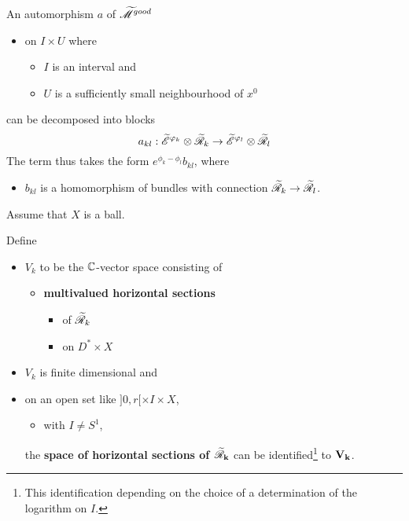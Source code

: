 An automorphism $a$ of $\widetilde{\mathscr{M}}^{good}$
\begin{itemize}
  \item on $I\times U$ where
    \begin{itemize}
      \item $I$ is an interval and
      \item $U$ is a sufficiently small neighbourhood of $x^0$
    \end{itemize}
\end{itemize}
can be decomposed into blocks
\[
  a_{kl}:\widetilde{\mathscr{E}}^{\varphi_k}\otimes\widetilde{\mathscr{R}}_k
    \to
    \widetilde{\mathscr{E}}^{\varphi_l}\otimes\widetilde{\mathscr{R}}_l
\]
The term thus takes the form $e^{\phi_k-\phi_l}b_{kl}$, where
\begin{itemize}
  \item $b_{kl}$ is a homomorphism of bundles with connection
    $\widetilde{\mathscr{R}}_k\to\widetilde{\mathscr{R}}_l$.
\end{itemize}
Assume that $X$ is a ball.
\begin{defn}
  Define
  \begin{itemize}
    \item $V_k$ to be the $\mathbb{C}$-vector space consisting of
      \begin{itemize}
        \item \textbf{multivalued horizontal sections} \TODO[Def?]
          \begin{itemize}
            \item of $\widetilde{\mathscr{R}}_k$
            \item on $D^*\times X$
          \end{itemize}
      \end{itemize}
  \end{itemize}
  \begin{rem}
    \begin{itemize}
      \item $V_k$ is finite dimensional and
      \item on an open set like $]0,r[\times I\times X$,
        \begin{itemize}
          \item with $I\neq S^1$,
        \end{itemize}
        the \textbf{space of horizontal sections of $\bf\widetilde{\mathscr{R}}_k$}
        can be identified\footnote{This identification depending on the choice
        of a determination of the logarithm on $I$.} to \textbf{$\bf V_k$}.
    \end{itemize}
  \end{rem}
\end{defn}
